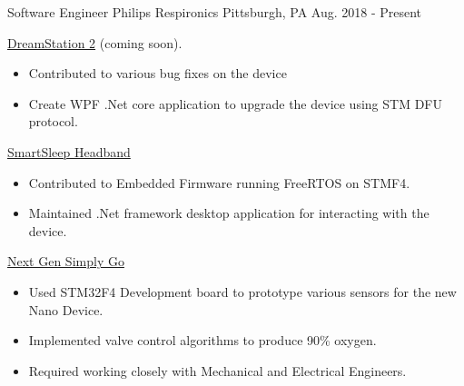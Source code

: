 


\begin{cventries}


\cventry
{Software Engineer} %
{Philips Respironics} %
{Pittsburgh, PA} %
{Aug. 2018 - Present} %
{ %
\begin{cvitems}
\item 
{
    \href{https://www.usa.philips.com/healthcare/product/HCNOCTN447/dreamstation-cpap-bi-level-therapy-systems}{\color{RoyalBlue}DreamStation 2} 
    (coming soon).
    \begin{itemize}
        \item Contributed to various bug fixes on the device
        \item Create WPF .Net core application to upgrade the device using STM DFU protocol. 
    \end{itemize} 
}
\item 
{
    \href{https://www.usa.philips.com/c-e/smartsleep/deep-sleep-headband.html}{\color{RoyalBlue}SmartSleep Headband} 
    \begin{itemize}
        \item Contributed to Embedded Firmware running FreeRTOS on STMF4.
        \item Maintained .Net framework desktop application for interacting with the device.
    \end{itemize} 
}
\item 
{
    \href{https://www.usa.philips.com/healthcare/product/HCNOCTN350/simplygo-mini-portable-oxygen-concentrator-poc}{\color{RoyalBlue}Next Gen Simply Go} 
    \begin{itemize}
        \item Used STM32F4 Development board to prototype various sensors for the new Nano Device.
        \item Implemented valve control algorithms to produce 90\% oxygen.
        \item Required working closely with Mechanical and Electrical Engineers. 

\end{itemize}}
\end{cvitems}}
\end{cventries}
